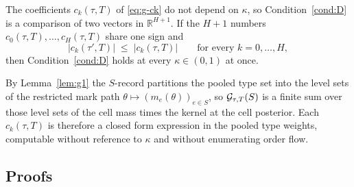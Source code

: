 \begin{remark}
\label{rem:g-Dstar}
The coefficients $c_k(\tau,T)$ of \eqref{eq:g-ck} do not depend on $\kappa$, so
Condition~\ref{cond:D} is a comparison of two vectors in $\mathbb R^{H+1}$. If the $H+1$ numbers
$c_0(\tau,T),\ldots,c_H(\tau,T)$ share one sign and
\begin{equation}
\label{eq:g-Dstar}
|c_k(\tau',T)| \;\le\; |c_k(\tau,T)| \qquad\text{for every } k = 0,\ldots,H,
\end{equation}
then Condition~\ref{cond:D} holds at every $\kappa \in (0,1)$ at once.
\end{remark}

\begin{remark}
\label{rem:g-cells}
By Lemma~\ref{lem:g1} the $S$-record partitions the pooled type set into the level sets of the
restricted mark path $\theta \mapsto (m_e(\theta))_{e \in S}$, so $\mathcal{G}_{\tau,T}(S)$ is a finite
sum over those level sets of the cell mass times the kernel at the cell posterior. Each
$c_k(\tau,T)$ is therefore a closed form expression in the pooled type weights, computable
without reference to $\kappa$ and without enumerating order flow.
\end{remark}

\subsection*{Proofs}
\label{sec:pf-garbling-proofs}

